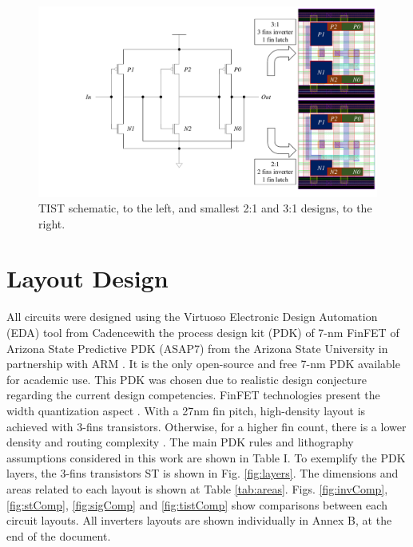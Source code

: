 \documentclass[pgmicro,diss,english]{iiufrgs}
\begin{document}
\begin{figure}[]
\centering
\includegraphics[width=\textwidth, trim={4.5cm 0cm 0cm 0cm},clip]{TISTreis.pdf}
\caption{TIST schematic, to the left, and smallest 2:1 and 3:1 designs, to the right.}
\label{TISTreis}
\end{figure}
\section{Layout Design}

All circuits were designed using the Virtuoso Electronic Design Automation (EDA) tool from Cadence\textregistered with the process design kit (PDK) of 7-nm FinFET of Arizona State Predictive PDK (ASAP7) from the Arizona State University in partnership with ARM \cite{clark2016asap7}. It is the only open-source and free 7-nm PDK available for academic use. This PDK was chosen due to realistic design conjecture regarding the current design competencies. FinFET technologies present the width quantization aspect \cite{2000Simulations}. With a 27nm fin pitch, high-density layout is achieved with 3-fins transistors. Otherwise, for a higher fin count, there is a lower density and routing complexity \cite{chava2015standard}. The main PDK rules and lithography assumptions considered in this work are shown in Table I. To exemplify the PDK layers, the 3-fins transistors ST is shown in Fig. \ref{fig:layers}. The dimensions and areas related to each layout is shown at Table \ref{tab:areas}. Figs. \ref{fig:invComp}, \ref{fig:stComp}, \ref{fig:sigComp} and \ref{fig:tistComp} show comparisons between each circuit layouts. All inverters layouts are shown individually in Annex B, at the end of the document. %
\end{document}
